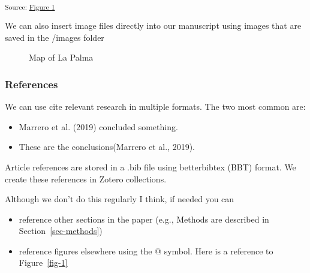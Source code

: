 \documentclass[
]{agujournal2019}
\providecommand{\tightlist}{%
  \setlength{\itemsep}{0pt}\setlength{\parskip}{0pt}}\usepackage{longtable,booktabs,array}
\begin{document}
\textsubscript{Source:
\href{https://jjcurtin.github.io/study_template/notebooks/fig1-preview.html\#cell-fig-1}{Figure
1}}

We can also insert image files directly into our manuscript using images
that are saved in the /images folder

\begin{figure}


\caption{\label{fig-map}Map of La Palma}

\end{figure}%

\subsubsection{References}\label{references}

We can use cite relevant research in multiple formats. The two most
common are:

\begin{itemize}
\tightlist
\item
  Marrero et al. (2019) concluded something.\\
\item
  These are the conclusions(Marrero et al., 2019).
\end{itemize}

Article references are stored in a .bib file using betterbibtex (BBT)
format. We create these references in Zotero collections.

Although we don't do this regularly I think, if needed you can

\begin{itemize}
\tightlist
\item
  reference other sections in the paper (e.g., Methods are described in
  Section~\ref{sec-methods})
\item
  reference figures elsewhere using the @ symbol. Here is a reference to
  Figure~\ref{fig-1}
\end{itemize}
\end{document}
